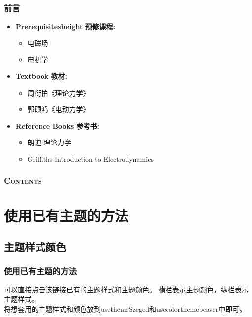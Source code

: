 \documentclass[aspectratio=169, 10pt, utf8, mathserif]{beamer}
\def\hilite<#1>{\temporal<#1>{\color{blue!80}}{\color{blue!85!white}}{\color{black}}}%
\numberwithin{equation}{section} %
\numberwithin{figure}{section} %
\begin{document}
\begin{frame}
\frametitle{\textsc{前言}}
\begin{itemize}
\item\hilite<1> {\bf Prerequisitesheight 预修课程:}
    \begin{itemize}
    \item 电磁场
    \item 电机学
    \end{itemize}\pause

\item\hilite<2> {\bf Textbook 教材:}
    \begin{itemize}
    \item 周衍柏\quad 《理论力学》
    \item 郭硕鸿\quad 《电动力学》
    \end{itemize}\pause   %

\item\hilite<3> {\bf Reference Books 参考书:}
    \begin{itemize}
    \item 朗道 \quad 理论力学
    \item Griffiths \quad Introduction to Electrodynamics
    \end{itemize}
\end{itemize}

\end{frame}


\begin{frame}
  \frametitle{\textsc{Contents}} \vspace{-0.3cm}
  \tableofcontents[hidesubsections]
\end{frame}





\section{使用已有主题的方法}
\subsection{主题样式颜色}
\begin{frame}
	\frametitle{使用已有主题的方法}
可以直接点击该链接\underline{\href{https://mpetroff.net/files/beamer-theme-matrix/}{已有的主题样式和主题颜色}}。
横栏表示主题颜色，纵栏表示主题样式。\\
将想套用的主题样式和颜色放到usetheme{Szeged}和usecolortheme{beaver}中即可。
\end{frame}
\end{document}

